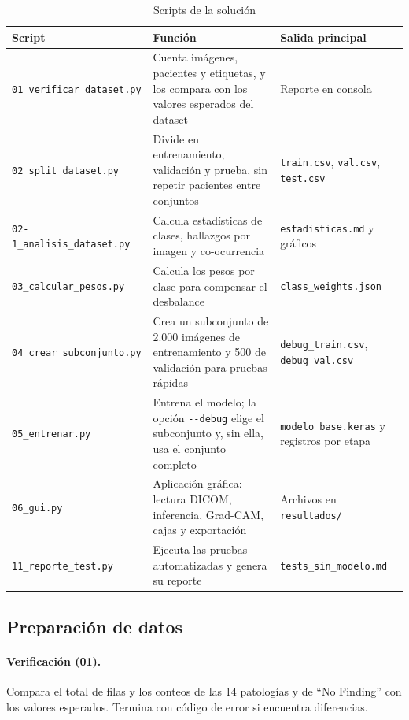 \documentclass[11.5pt]{article}
\begin{document}
\begin{table}[H]
\centering
\footnotesize
\caption{Scripts de la solución}
\label{tab:scripts}
\begin{tabularx}{\textwidth}{L{3.9cm} X L{4.3cm}}
\toprule
Script & Función & Salida principal \\
\midrule
\texttt{01\_verificar\_dataset.py} & Cuenta imágenes, pacientes y etiquetas, y los compara con los valores esperados del dataset & Reporte en consola \\
\texttt{02\_split\_dataset.py} & Divide en entrenamiento, validación y prueba, sin repetir pacientes entre conjuntos & \texttt{train.csv}, \texttt{val.csv}, \texttt{test.csv} \\
\texttt{02-1\_analisis\_dataset.py} & Calcula estadísticas de clases, hallazgos por imagen y co-ocurrencia & \texttt{estadisticas.md} y gráficos \\
\texttt{03\_calcular\_pesos.py} & Calcula los pesos por clase para compensar el desbalance & \texttt{class\_weights.json} \\
\texttt{04\_crear\_subconjunto.py} & Crea un subconjunto de 2.000 imágenes de entrenamiento y 500 de validación para pruebas rápidas & \texttt{debug\_train.csv}, \texttt{debug\_val.csv} \\
\texttt{05\_entrenar.py} & Entrena el modelo; la opción \texttt{-{}-debug} elige el subconjunto y, sin ella, usa el conjunto completo & \texttt{modelo\_base.keras} y registros por etapa \\
\texttt{06\_gui.py} & Aplicación gráfica: lectura DICOM, inferencia, Grad-CAM, cajas y exportación & Archivos en \texttt{resultados/} \\
\texttt{11\_reporte\_test.py} & Ejecuta las pruebas automatizadas y genera su reporte & \texttt{tests\_sin\_modelo.md} \\
\bottomrule
\end{tabularx}
\end{table}

\subsection{Preparación de datos}

\paragraph{Verificación (01).} Compara el total de filas y los conteos de las 14 patologías y de ``No Finding'' con los valores esperados. Termina con código de error si encuentra diferencias.
\end{document}
